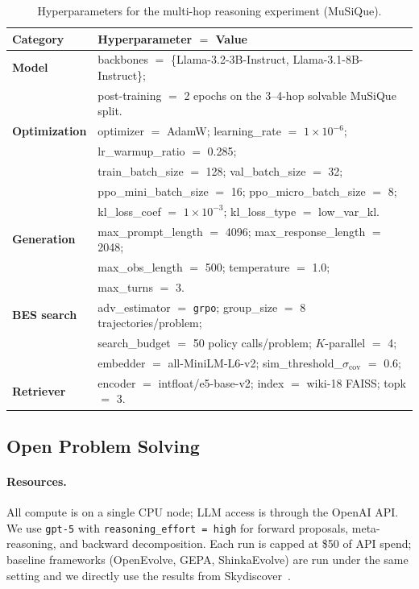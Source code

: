 \documentclass{llmxive}
\begin{document}
\begin{table}[h]
\centering
\begin{tabularx}{\textwidth}{@{}lX@{}}
\toprule
\textbf{Category} & \textbf{Hyperparameter $=$ Value} \\
\midrule
\textbf{Model} &
backbones $=$ \{Llama-3.2-3B-Instruct, Llama-3.1-8B-Instruct\}; \\
& post-training $=$ 2 epochs on the 3--4-hop solvable MuSiQue split. \\
\midrule
\textbf{Optimization} &
optimizer $=$ AdamW; learning\_rate $=$ $1\!\times\!10^{-6}$; \\
& lr\_warmup\_ratio $=$ 0.285; \\
& train\_batch\_size $=$ 128; val\_batch\_size $=$ 32; \\
& ppo\_mini\_batch\_size $=$ 16; ppo\_micro\_batch\_size $=$ 8; \\
& kl\_loss\_coef $=$ $1\!\times\!10^{-3}$; kl\_loss\_type $=$ low\_var\_kl. \\
\midrule
\textbf{Generation} &
max\_prompt\_length $=$ 4096; max\_response\_length $=$ 2048; \\
& max\_obs\_length $=$ 500; temperature $=$ 1.0; \\
&max\_turns $=$ 3. \\
\midrule
\textbf{BES search} &
adv\_estimator $=$ \texttt{grpo}; group\_size $=$ 8 trajectories/problem; \\
& search\_budget $=$ 50 policy calls/problem; $K$-parallel $=$ 4; \\
& embedder $=$ all-MiniLM-L6-v2; sim\_threshold\_$\sigma_\mathrm{cov}$ $=$ 0.6; \\
\midrule
\textbf{Retriever} &
encoder $=$ intfloat/e5-base-v2; index $=$ wiki-18 FAISS; topk $=$ 3. \\
\bottomrule
\end{tabularx}
\caption{Hyperparameters for the multi-hop reasoning experiment (MuSiQue).}
\label{tab:hyperparams_multihop}
\end{table}


\subsection{Open Problem Solving}
\label{app:inference_setup}

\paragraph{Resources.}
All compute is on a single CPU node; LLM access is through the OpenAI
API. We use \texttt{gpt-5} with \texttt{reasoning\_effort = high} for
forward proposals, meta-reasoning, and backward decomposition. Each run
is capped at \$50 of API spend; baseline frameworks (OpenEvolve, GEPA,
ShinkaEvolve) are run under the same setting and we directly use the results from Skydiscover~\citep{skydiscover}.
\end{document}
